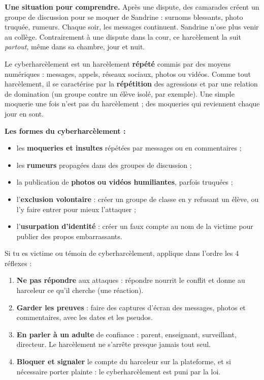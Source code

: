 \documentclass[11pt]{article}
\newcommand{\cle}[1]{{\popxbold\color{popdark}#1}}
\newcounter{popsec}
\newcounter{popsub}
\newcommand{\courssub}[1]{%
  \stepcounter{popsub}%
  \par\vspace{9pt}\noindent{\popxbold\fontsize{11.5}{13}\selectfont\color{popink}{\color{poporange}\thepopsec.\thepopsub}\hspace{6pt}#1}\par\nopagebreak\vspace{4pt}
}
\begin{document}
\courssub{Le cyberharcèlement}

\textbf{Une situation pour comprendre.} Après une dispute, des camarades créent un groupe de discussion pour se moquer de Sandrine : surnoms blessants, photo truquée, rumeurs. Chaque soir, les messages continuent. Sandrine n'ose plus venir au collège. Contrairement à une dispute dans la cour, ce harcèlement la suit \emph{partout}, même dans sa chambre, jour et nuit.

\begin{definition}[Cyberharcèlement]
Le \cle{cyberharcèlement} est un harcèlement \textbf{répété} commis par des moyens numériques : messages, appels, réseaux sociaux, photos ou vidéos. Comme tout harcèlement, il se caractérise par la \textbf{répétition} des agressions et par une relation de domination (un groupe contre un élève isolé, par exemple). Une simple moquerie une fois n'est pas du harcèlement ; des moqueries qui reviennent chaque jour en sont.
\end{definition}

\textbf{Les formes du cyberharcèlement :}
\begin{itemize}
  \item les \textbf{moqueries et insultes} répétées par messages ou en commentaires ;
  \item les \textbf{rumeurs} propagées dans des groupes de discussion ;
  \item la publication de \textbf{photos ou vidéos humiliantes}, parfois truquées ;
  \item l'\textbf{exclusion volontaire} : créer un groupe de classe en y refusant un élève, ou l'y faire entrer pour mieux l'attaquer ;
  \item l'\textbf{usurpation d'identité} : créer un faux compte au nom de la victime pour publier des propos embarrassants.
\end{itemize}

\begin{methode}
Si tu es victime ou témoin de cyberharcèlement, applique dans l'ordre les 4 réflexes :
\begin{enumerate}
  \item \textbf{Ne pas répondre} aux attaques : répondre nourrit le conflit et donne au harceleur ce qu'il cherche (une réaction).
  \item \textbf{Garder les preuves} : faire des captures d'écran des messages, photos et commentaires, avec les dates et les pseudos.
  \item \textbf{En parler à un adulte} de confiance : parent, enseignant, surveillant, directeur. Le harcèlement ne s'arrête presque jamais tout seul.
  \item \textbf{Bloquer et signaler} le compte du harceleur sur la plateforme, et si nécessaire porter plainte : le cyberharcèlement est puni par la loi.
\end{enumerate}
\end{methode}
\end{document}
